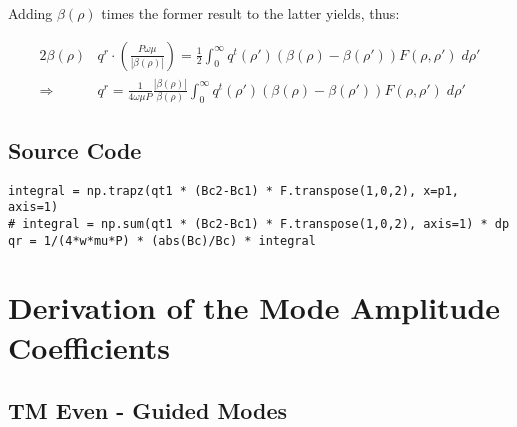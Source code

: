 \documentclass[11pt, oneside]{article}   	%
\begin{document}
\noindent

Adding $\beta (\rho)$ times the former result to the latter yields, thus:

\begin{align}
2 \beta(\rho) &q^{r} \cdot \left( \frac{P \omega \mu}{|\beta(\rho)|} \right) = \frac{1}{2} \int_{0}^{\infty} q^{t} (\rho ') (\beta (\rho) - \beta(\rho ')) F(\rho, \rho ') \; d\rho' \nonumber \\
\Rightarrow \; &q^{r} = \frac{1}{4 \omega \mu P} \frac{|\beta(\rho)|}{\beta(\rho)} \int_{0}^{\infty} q^{t} (\rho ') (\beta (\rho) - \beta(\rho ')) F (\rho, \rho ') \; d\rho'
\end{align}

\subsection{Source Code}

\begin{lstlisting}
integral = np.trapz(qt1 * (Bc2-Bc1) * F.transpose(1,0,2), x=p1, axis=1)
# integral = np.sum(qt1 * (Bc2-Bc1) * F.transpose(1,0,2), axis=1) * dp
qr = 1/(4*w*mu*P) * (abs(Bc)/Bc) * integral
\end{lstlisting}






\newpage

\section{Derivation of the Mode Amplitude Coefficients}
\label{sec:coefficients}

\subsection{TM Even - Guided Modes}
\end{document}
